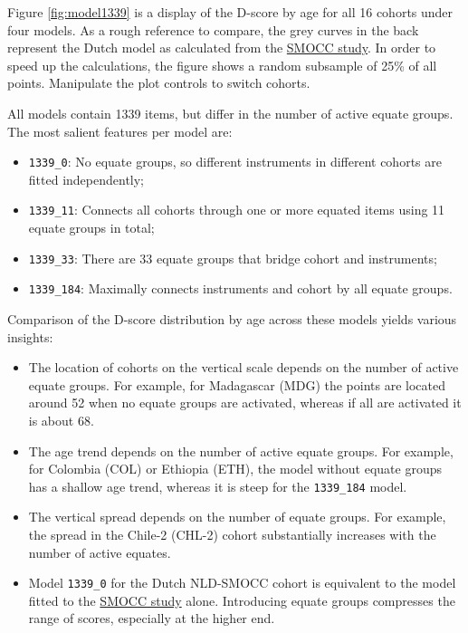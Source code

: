 \documentclass[
]{book}
\providecommand{\tightlist}{%
  \setlength{\itemsep}{0pt}\setlength{\parskip}{0pt}}
\begin{document}
Figure \ref{fig:model1339} is a display of the D-score by age for all 16 cohorts under four models. As a rough reference to compare, the grey curves in the back represent the Dutch model as calculated from the \href{https://d-score.org/dbook1/sec-smoccstudy.html}{SMOCC study}. In order to speed up the calculations, the figure shows a random subsample of 25\% of all points. Manipulate the plot controls to switch cohorts.

All models contain 1339 items, but differ in the number of active equate groups. The most salient features per model are:

\begin{itemize}
\tightlist
\item
  \texttt{1339\_0}: No equate groups, so different instruments in different cohorts are fitted independently;
\item
  \texttt{1339\_11}: Connects all cohorts through one or more equated items using 11 equate groups in total;
\item
  \texttt{1339\_33}: There are 33 equate groups that bridge cohort and instruments;
\item
  \texttt{1339\_184}: Maximally connects instruments and cohort by all equate groups.
\end{itemize}

Comparison of the D-score distribution by age across these models yields various insights:

\begin{itemize}
\item
  The location of cohorts on the vertical scale depends on the number of active equate groups. For example, for Madagascar (MDG) the points are located around 52 when no equate groups are activated, whereas if all are activated it is about 68.
\item
  The age trend depends on the number of active equate groups. For example, for Colombia (COL) or Ethiopia (ETH), the model without equate groups has a shallow age trend, whereas it is steep for the \texttt{1339\_184} model.
\item
  The vertical spread depends on the number of equate groups. For example, the spread in the Chile-2 (CHL-2) cohort substantially increases with the number of active equates.
\item
  Model \texttt{1339\_0} for the Dutch NLD-SMOCC cohort is equivalent to the model fitted to the \href{https://d-score.org/dbook1/sec-smoccstudy.html}{SMOCC study} alone. Introducing equate groups compresses the range of scores, especially at the higher end.
\end{itemize}
\end{document}
